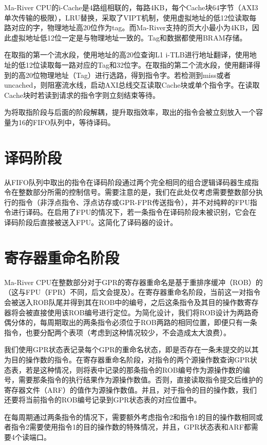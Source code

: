 Ma-River CPU的i-Cache是4路组相联的，每路4KB，每个Cache块64字节（AXI3单次传输的极限），LRU替换，采取了VIPT机制，使用虚拟地址的低12位读取每路对应的字，物理地址高20位作为tag。而Ma-River支持的页大小最小为4KB，因此虚拟地址低12位一定是与物理地址一致的。Tag和数据都使用BRAM存储。

在取指的第一个流水段，使用地址的高20位查询L1 i-TLB进行地址翻译，使用地址的低12位读取每一路对应的Tag和32位字。在取指的第二个流水段，使用翻译得到的高20位物理地址（Tag）进行选路，得到指令字。若检测到miss或者uncached，则阻塞流水线，启动AXI总线交互读取Cache块或单个指令字。在读取Cache块时若读到请求的指令字则立刻结束等待。

为将取指阶段与后面的阶段解耦，提升取指效率，取出的指令会被立刻放入一个容量为16的FIFO队列中，等待译码。

\section{译码阶段}

从FIFO队列中取出的指令在译码阶段通过两个完全相同的组合逻辑译码器生成指令在整数部分所需的控制信号。需要注意的是，我们在此处仅考虑需要整数部分执行的指令（非浮点指令、浮点访存或GPR-FPR传送指令），并不对纯粹的FPU指令进行译码。在启用了FPU的情况下，若一条指令在译码阶段未被识别，它会在译码阶段后直接被送入FPU。这简化了译码器的设计。

\section{寄存器重命名阶段}

Ma-River CPU在整数部分对于GPR的寄存器重命名是基于重排序缓冲（ROB）的（这与FPU（FPR）不同，后文会提及）。在寄存器重命名阶段，当前这一对指令会被送入ROB队尾并得到其在ROB中的编号，之后这条指令及其目的操作数寄存器将会被直接使用该ROB编号进行定位。为简化设计，我们将ROB设计为两路奇偶分体的，每周期取出的两条指令必须位于ROB两路的相同位置，即便只有一条指令，也要分配两个表项（考虑到这种情况较少，不会造成太大浪费）。

我们使用GPR状态表记录每个GPR的重命名状态，即是否存在一条未提交的以其为目的操作数的指令。在寄存器重命名阶段，对指令的两个源操作数查询GPR状态表，若是这种情况，则将表中记录的那条指令的ROB编号作为源操作数的编号，需要那条指令的执行结果作为源操作数值。否则，直接读取指令提交后维护的寄存器文件（ARF）的值作为源操作数值。并且，对于指令的目的操作数，我们还要将当前指令的ROB编号记录到GPR状态表的对应位置中。

在每周期通过两条指令的情况下，需要额外考虑指令2和指令1的目的操作数相同或者指令2需要使用指令1的目的操作数的特殊情况，并且，GPR状态表和ARF都需要4个读端口。

